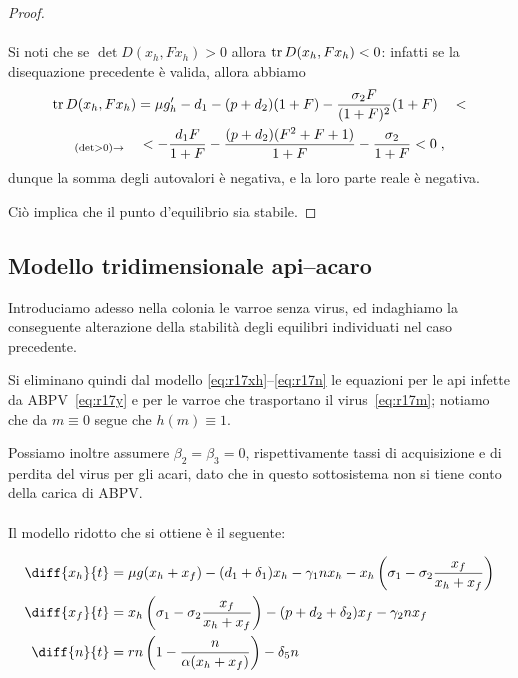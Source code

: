 \begin{proof}
\paragraph{}
Si noti che se $\det D(x_h, F x_h) > 0$ allora $\operatorname{tr} D(x_h, F x_h) <0$: infatti se la disequazione
precedente è valida, allora abbiamo
\begin{multline*}
\operatorname{tr} D(x_h, F x_h) = \mu g_h' -d_1 -(p+d_2)(1+F) - \frac{\sigma_2 F}{(1+F)^2} (1+F)
\quad < \\
 _{(\det >0) \rightarrow} \quad
< - \frac{d_1 F}{1+F} - \frac{(p +d_2) (F^2 +F+1)}{1+F} - \frac{\sigma_2}{1+F} < 0 \; ,
\end{multline*}
dunque la somma degli autovalori è negativa, e la loro parte reale è negativa.

Ciò implica che il punto d'equilibrio sia stabile.
\end{proof}


\subsection{Modello tridimensionale api--acaro}
\label{sec:r17rid3D}
Introduciamo adesso nella colonia le varroe senza virus, ed indaghiamo la conseguente alterazione della stabilità degli equilibri individuati nel caso precedente.

Si eliminano quindi dal modello \eqref{eq:r17xh}--\eqref{eq:r17n} le equazioni per le api infette
da ABPV~\eqref{eq:r17y} e per le varroe che trasportano il virus~\eqref{eq:r17m};
notiamo che da $m \equiv 0$ segue che $h(m) \equiv 1$.

Possiamo inoltre assumere $\beta_2 = \beta_3 = 0$, rispettivamente tassi di acquisizione e di perdita
del virus per gli acari, dato che in questo sottosistema non si tiene conto della carica di ABPV.

\paragraph{}
Il modello ridotto che si ottiene è il seguente:

\begin{align}
    \diff{x_h}{t} &= \mu g( x_h + x_f ) - (d_1 + \delta_1) x_h - \gamma_1 n x_h
        - x_h \left( \sigma_1 - \sigma_2 \frac{x_f}{x_h + x_f} \right)
        \label{eq:rattiRidotto2prima}
    \\
    \diff{x_f}{t} &= x_h \left( \sigma_1 - \sigma_2 \frac{x_f}{x_h + x_f} \right) - (p + d_2 + \delta_2) x_f
        - \gamma_2 n x_f
    \\
    \diff{n}{t} &= rn \left( 1 - \frac{n}{ \alpha (x_h + x_f) } \right) - \delta_5 n
        \label{eq:rattiRidotto2terza}
\end{align}

